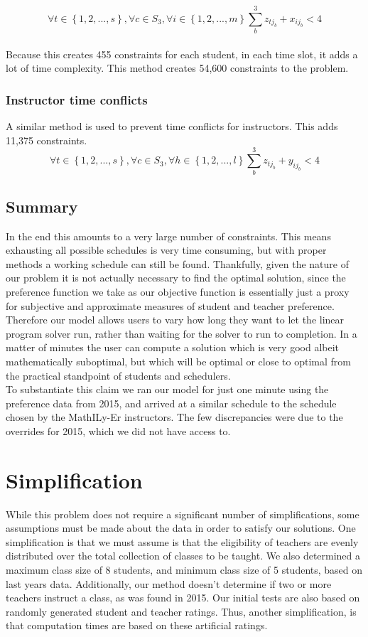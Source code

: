 \documentclass[11pt]{article}
\begin{document}
\[\forall t \in \left\{ {1,2,...,s}\right\},\forall c \in S_3, \forall i \in \left\{ {1,2,...,m}\right\} \sum_{b}^{3}z_{tj_b}+x_{ij_b} < 4\]
\\Because this creates 455 constraints for each student, in each time slot, it adds a lot of time complexity. This method creates 54,600 constraints to the problem.
\subsubsection{Instructor time conflicts}
A similar method is used to prevent time conflicts for instructors. This adds 11,375 constraints.
\[\forall t \in \left\{ {1,2,...,s}\right\},\forall c \in S_3, \forall h \in \left\{ {1,2,...,l}\right\} \sum_{b}^{3}z_{tj_b}+y_{ij_b} < 4\]
\subsection{Summary}
\indent In the end this amounts to a very large number of constraints. This means exhausting all possible schedules is very time consuming, but with proper methods a working schedule can still be found. Thankfully, given the nature of our problem it is not actually necessary to find the optimal solution, since the preference function we take as our objective function is essentially just a proxy for subjective and approximate measures of student and teacher preference. Therefore our model allows users to vary how long they want to let the linear program solver run, rather than waiting for the solver to run to completion. In a matter of minutes the user can compute a solution which is very good albeit mathematically suboptimal, but which will be optimal or close to optimal from the practical standpoint of students and schedulers.\\
\indent To substantiate this claim we ran our model for just one minute using the preference data from 2015, and arrived at a similar schedule to the schedule chosen by the MathILy-Er instructors. The few discrepancies were due to the overrides for 2015, which we did not have access to.

\section{Simplification}
While this problem does not require a significant number of simplifications, some assumptions must be made about the data in order to satisfy our solutions. One simplification is that we must assume is that the eligibility of teachers are evenly distributed over the total collection of classes to be taught. We also determined a maximum class size of 8 students, and minimum class size of 5 students, based on last years data. Additionally, our method doesn't determine if two or more teachers instruct a class, as was found in 2015. Our initial tests are also based on  randomly generated student and teacher ratings. Thus, another simplification, is that computation times are based on these artificial ratings. \\
\end{document}
